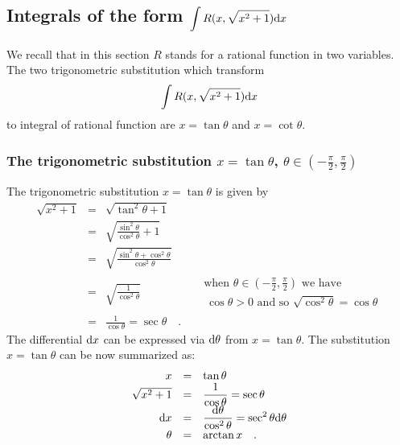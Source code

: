 \documentclass[12pt]{book}
\begin{document}
\subsection{Integrals of the form $\displaystyle \int R(x,\sqrt{x^2+1}){\normalfont \text{d}} x$}
We recall that in this section $R$ stands for a rational function in two variables. The two trigonometric substitution which transform
\[
\int R(x, \sqrt{x^2+1}){\normalfont \text{d}} x
\]
to integral of rational function are $x=\tan \theta$ and $x=\cot \theta$.
\subsubsection{The trigonometric substitution $x=\tan \theta$, $\displaystyle \theta\in \left(-\frac{\pi}{2}, \frac{\pi}{2}\right)$ }\label{secTrigSubtanTheta}
The trigonometric substitution $x=\tan \theta$ is given by
\[
\begin{array}{rcll|l}
\displaystyle \sqrt{ x^2+1}&=&\displaystyle \sqrt{\tan^2 \theta+1}\\
&=&\displaystyle   \sqrt{ \frac{ \sin^2 \theta}{ \cos^2 \theta} +1}\\
&=&\displaystyle \sqrt{ \frac{ \sin^2\theta+\cos^2 \theta}{ \cos^2 \theta}} \\
&=& \displaystyle \sqrt{\frac{1}{\cos^2\theta}} && \begin{array}{l} \displaystyle \text{when }\theta\in \left(-\frac{\pi}{2}, \frac{\pi}{2}\right) \text{ we have }\\ ~ \cos \theta > 0\text{ and so } \sqrt{\cos^2 \theta}=\cos\theta \end{array}\\
&=&\displaystyle  \frac{1}{\cos \theta}= \sec \theta\quad .
\end{array}
\]
The differential ${\normalfont \text{d}} x$ can be expressed via ${\normalfont \text{d}} \theta$ from $x=\tan \theta$. The substitution $x=\tan \theta$ can be now summarized as:
\[
\begin{array}{rcl}
x&=&\displaystyle \tan \theta\\
\sqrt{x^2+1}& =& \displaystyle \frac{1}{\cos \theta}=\sec \theta\\
{\normalfont \text{d}} x &=&\displaystyle \frac{{\normalfont \text{d}} \theta}{\cos^2\theta}= \sec^2 \theta {\normalfont \text{d}} \theta\\
\theta& =& \arctan x\quad .
\end{array}
\]
\end{document}
